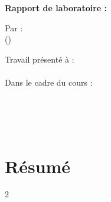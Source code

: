 \documentclass{article}
\begin{document}
\begin{titlepage}
\begin{center}
    \Large \university

    \vspace{2.5cm}

    \LARGE
    \textbf{Rapport de laboratoire :} \vspace{0.25em}

    \textbf{\reporttitle}

    \vspace{2.5cm}

    \Large
    Par :\\
    \textit{\reportauthor} (\studentid)

    \vfill

    Travail présenté à :\\
    \vspace{1em}
    \textit{\professor} \\
    \vspace{1em}
    Dans le cadre du cours : \coursecode \\
    \coursename \\

    \vspace{2.5cm}

    \program \\
    \department \\

    \vspace{2.5cm}

    \reportdate

\end{center}
\end{titlepage}

\section*{\hfill Résumé \hfill}


\begin{multicols}{2}





\end{multicols}



\end{document}
